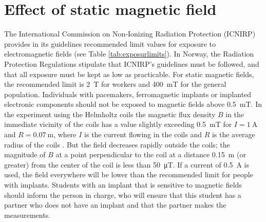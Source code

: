 \documentclass[../Elmag-labhefte-2020.tex]{subfiles}
\begin{document}


\section{Effect of static magnetic field}
The International Commission on Non-Ionizing Radiation Protection (ICNIRP) provides in its guidelines recommended limit values   for exposure to electromagnetic fields (see Table \ref{tab:exposurlimits}). In Norway, the Radiation Protection Regulations stipulate that ICNIRP's guidelines must be followed, and that all exposure must be kept as low as practicable. For static magnetic fields, the recommended limit is \SI{2}{\tesla} for workers and \SI{400}{\milli\tesla} for the general population. Individuals with pacemakers, ferromagnetic implants or implanted electronic components should not be exposed to magnetic fields above \SI{0,5}{\milli\tesla}.  In the experiment using the Helmholtz coils the magnetic flux density $B$ in the immediate vicinity of the coils has a value slightly exceeding \SI{0,5}{\milli\tesla} for $I = \SI{1}{\ampere}$ and $R = \SI{0,07}{\m}$, where $I$ is the current flowing in the coils and $R$ is the average radius of the coils . But the field decreases rapidly outside the coils; the magnitude of $B$ at a point perpendicular to the coil at a distance \SI{0,15}{\m} (or greater) from the center of the coil is less than \SI{50}{\micro\tesla}. If a current of \SI{0,5}{\ampere} is used, the field everywhere will be lower than the recommended limit for people with implants.
Students
with an implant that is sensitive to magnetic fields should inform the person in charge, who will ensure that this student has a partner who does not have an implant and that the partner makes the measurements.
\end{document}
